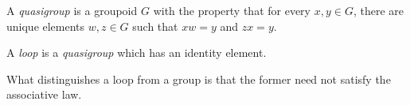 \documentclass[12pt]{article}
\begin{document}
A \emph{quasigroup} is a groupoid $G$ with the property that for every $x, y \in G$, there are unique elements $w, z \in G$ such that $xw = y$ and $zx = y$.

A \emph{loop} is a \emph{quasigroup} which has an identity element.

What distinguishes a loop from a group is that the former need not satisfy the associative law.
\end{document}
